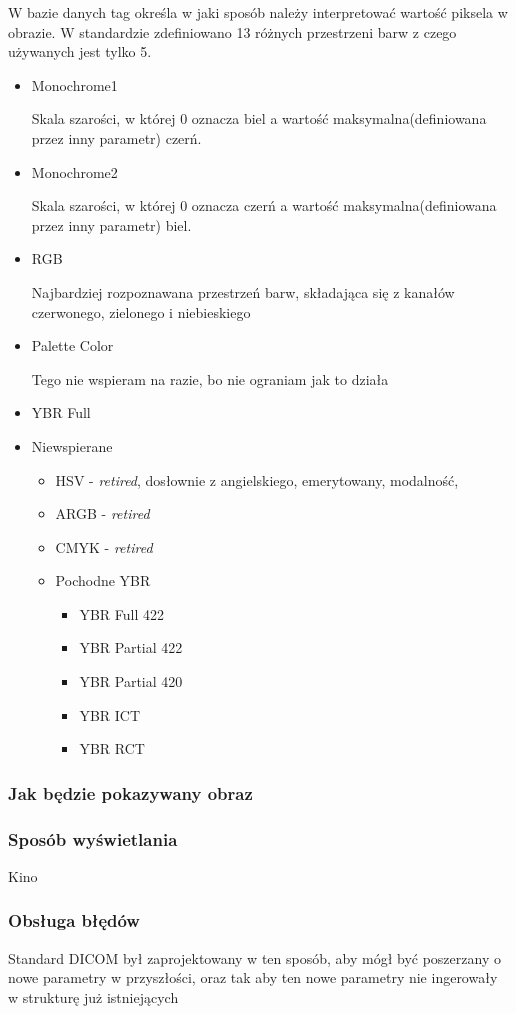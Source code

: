 W bazie danych tag  określa w jaki sposób należy interpretować wartość piksela w obrazie.
W standardzie zdefiniowano 13 różnych przestrzeni barw  z czego używanych jest tylko 5.

\begin{itemize}
    \item Monochrome1

    Skala szarości, w której 0 oznacza biel a wartość maksymalna(definiowana przez inny parametr) czerń.

    \item Monochrome2

    Skala szarości, w której 0 oznacza czerń a wartość maksymalna(definiowana przez inny parametr) biel.

    \item RGB

    Najbardziej rozpoznawana przestrzeń barw, składająca się z kanałów czerwonego, zielonego i niebieskiego

    \item Palette Color

    Tego nie wspieram na razie, bo nie ograniam jak to działa

    \item YBR Full


    \item Niewspierane
    \begin{itemize}
        \item HSV - \textit{retired}, dosłownie z angielskiego, emerytowany, modalność,
        \item ARGB - \textit{retired}
        \item CMYK - \textit{retired}
        \item Pochodne YBR
        \begin{itemize}
            \item YBR Full 422
            \item YBR Partial 422
            \item YBR Partial 420
            \item YBR ICT
            \item YBR RCT 
        \end{itemize}
    \end{itemize}

\end{itemize}

\subsubsection{Jak będzie pokazywany obraz}

\subsubsection{Sposób wyświetlania}

Kino

\subsubsection{Obsługa błędów}

Standard DICOM był zaprojektowany w ten sposób, aby mógł być poszerzany o nowe parametry w przyszłości, oraz tak aby ten nowe parametry nie ingerowały w strukturę już istniejących
